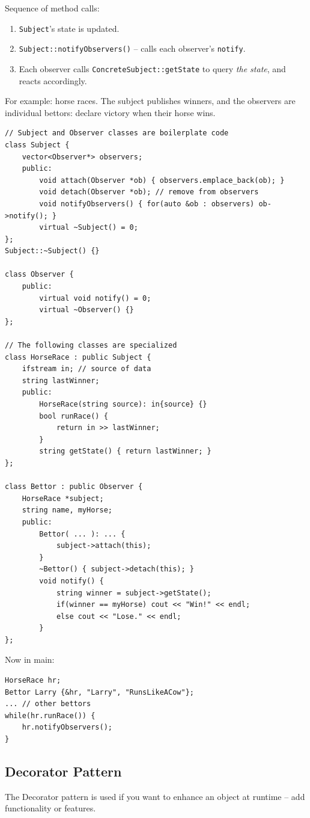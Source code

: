 \documentclass[11pt]{article}
\theoremstyle{definition}
\begin{document}
Sequence of method calls:\vspace{-0.25cm}
\begin{enumerate}
    \item {\tt Subject}'s state is updated.
    \item {\tt Subject::notifyObservers()} -- calls each observer's {\tt notify}.
    \item Each observer calls {\tt ConcreteSubject::getState} to query \emph{the state}, and reacts accordingly.
\end{enumerate}
\vspace{-0.25cm}
For example: horse races. The subject publishes winners, and the observers are individual bettors: declare victory when their horse wins.
\begin{lstlisting}
// Subject and Observer classes are boilerplate code
class Subject {
    vector<Observer*> observers;
    public:
        void attach(Observer *ob) { observers.emplace_back(ob); }
        void detach(Observer *ob); // remove from observers
        void notifyObservers() { for(auto &ob : observers) ob->notify(); }
        virtual ~Subject() = 0;
};
Subject::~Subject() {}

class Observer {
    public:
        virtual void notify() = 0;
        virtual ~Observer() {}
};

// The following classes are specialized
class HorseRace : public Subject {
    ifstream in; // source of data
    string lastWinner;
    public:
        HorseRace(string source): in{source} {}
        bool runRace() {
            return in >> lastWinner;
        }
        string getState() { return lastWinner; }
};

class Bettor : public Observer {
    HorseRace *subject;
    string name, myHorse;
    public:
        Bettor( ... ): ... {
            subject->attach(this);
        }
        ~Bettor() { subject->detach(this); }
        void notify() {
            string winner = subject->getState();
            if(winner == myHorse) cout << "Win!" << endl;
            else cout << "Lose." << endl;
        }
};
\end{lstlisting}
\vspace{-0.25cm}
Now in main:
\begin{lstlisting}
HorseRace hr;
Bettor Larry {&hr, "Larry", "RunsLikeACow"};
... // other bettors
while(hr.runRace()) {
    hr.notifyObservers();
}
\end{lstlisting}

\subsection{Decorator Pattern}
The Decorator pattern is used if you want to enhance an object at runtime -- add functionality or features.
\end{document}
